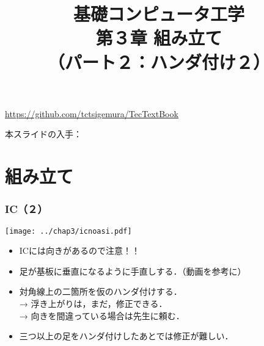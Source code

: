 \documentclass[handout]{beamer}        %
\begin{document}
\title{基礎コンピュータ工学\\第３章 組み立て\\
       （パート２：ハンダ付け２）}
\date{}

\begin{frame}
  \titlepage
  \centerline{\url{https://github.com/tctsigemura/TecTextBook}}
  \vfill
  \centerline{本スライドの入手：
    }
\end{frame}


\section{組み立て}

\begin{frame}
  \frametitle{IC（２）}
  \vfill
  \centerline{\texttt{[image: ../chap3/icnoasi.pdf]}}
  \vfill
  \begin{itemize}
  \item ICには向きがあるので注意！！
  \item 足が基板に垂直になるように手直しする．（動画を参考に）
  \item 対角線上の二箇所を仮のハンダ付けする．\\
    → 浮き上がりは，まだ，修正できる．\\
    → 向きを間違っている場合は先生に頼む．
  \item 三つ以上の足をハンダ付けしたあとでは修正が難しい．
  \end{itemize}
\end{frame}
\end{document}
